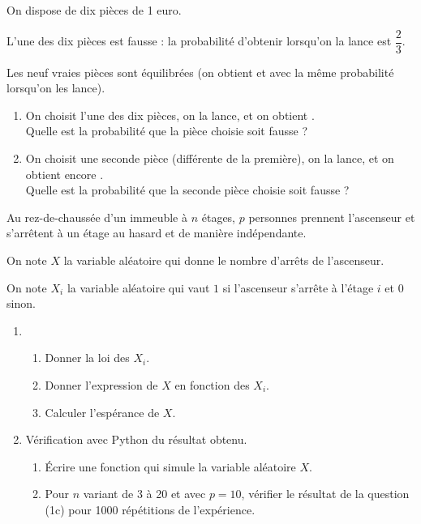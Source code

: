 \begin{exo}[Exercice 7]
On dispose de dix pièces de 1 euro.

L'une des dix pièces est fausse : la probabilité d'obtenir  lorsqu'on la lance est \(\dfrac{2}{3}\).

Les neuf vraies pièces sont équilibrées (on obtient  et  avec la même probabilité lorsqu'on les lance).

\begin{enumerate}
    \item On choisit l'une des dix pièces, on la lance, et on obtient . \\ Quelle est la probabilité que la pièce choisie soit fausse ? \\
    \item On choisit une seconde pièce (différente de la première), on la lance, et on obtient encore . \\ Quelle est la probabilité que la seconde pièce choisie soit fausse ?
\end{enumerate}
\end{exo}

\begin{corr}
\end{corr}

\begin{exo}
Au rez-de-chaussée d'un immeuble à \(n\) étages, \(p\) personnes prennent l'ascenseur et s'arrêtent à un étage au hasard et de manière indépendante.

On note \(X\) la variable aléatoire qui donne le nombre d'arrêts de l'ascenseur.

On note \(X_i\) la variable aléatoire qui vaut \(1\) si l'ascenseur s'arrête à l'étage \(i\) et \(0\) sinon.

\begin{enumerate}
    \item \begin{enumerate}
        \item Donner la loi des \(X_i\). \\
        \item Donner l'expression de \(X\) en fonction des \(X_i\). \\
        \item Calculer l'espérance de \(X\). \\
    \end{enumerate}
    \item Vérification avec Python du résultat obtenu. \\ \begin{enumerate}
        \item Écrire une fonction qui simule la variable aléatoire \(X\). \\
        \item Pour \(n\) variant de 3 à 20 et avec \(p=10\), vérifier le résultat de la question (1c) pour 1000 répétitions de l'expérience.
    \end{enumerate}
\end{enumerate}
\end{exo}


